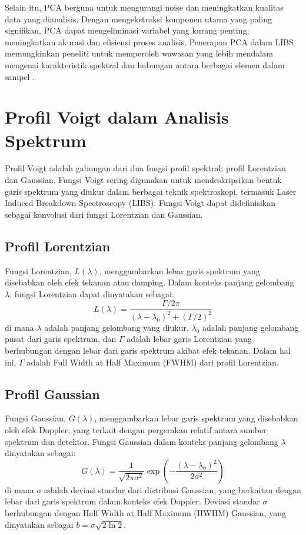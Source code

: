 \par Selain itu, PCA berguna untuk mengurangi noise dan meningkatkan kualitas data yang dianalisis. Dengan mengekstraksi komponen utama yang paling signifikan, PCA dapat mengeliminasi variabel yang kurang penting, meningkatkan akurasi dan efisiensi proses analisis. Penerapan PCA dalam LIBS memungkinkan peneliti untuk memperoleh wawasan yang lebih mendalam mengenai karakteristik spektral dan hubungan antara berbagai elemen dalam sampel \citep{lee2021}.

\section{Profil Voigt dalam Analisis Spektrum}
\par Profil Voigt adalah gabungan dari dua fungsi profil spektral: profil Lorentzian dan Gaussian. Fungsi Voigt sering digunakan untuk mendeskripsikan bentuk garis spektrum yang diukur dalam berbagai teknik spektroskopi, termasuk Laser Induced Breakdown Spectroscopy (LIBS). Fungsi Voigt dapat didefinisikan sebagai konvolusi dari fungsi Lorentzian dan Gaussian.

\subsection{Profil Lorentzian}
\par Fungsi Lorentzian, \( L(\lambda) \), menggambarkan lebar garis spektrum yang disebabkan oleh efek tekanan atau damping. Dalam konteks panjang gelombang \( \lambda \), fungsi Lorentzian dapat dinyatakan sebagai:
\begin{equation}
L(\lambda) = \frac{\Gamma / 2\pi}{(\lambda - \lambda_0)^2 + (\Gamma / 2)^2}
\end{equation}
di mana \( \lambda \) adalah panjang gelombang yang diukur, \( \lambda_0 \) adalah panjang gelombang pusat dari garis spektrum, dan \( \Gamma \) adalah lebar garis Lorentzian yang berhubungan dengan lebar dari garis spektrum akibat efek tekanan. Dalam hal ini, \( \Gamma \) adalah Full Width at Half Maximum (FWHM) dari profil Lorentzian.

\subsection{Profil Gaussian}
\par Fungsi Gaussian, \( G(\lambda) \), menggambarkan lebar garis spektrum yang disebabkan oleh efek Doppler, yang terkait dengan pergerakan relatif antara sumber spektrum dan detektor. Fungsi Gaussian dalam konteks panjang gelombang \( \lambda \) dinyatakan sebagai:
\begin{equation}
G(\lambda) = \frac{1}{\sqrt{2\pi \sigma^2}} \exp\left(-\frac{(\lambda - \lambda_0)^2}{2\sigma^2}\right)
\end{equation}
di mana \( \sigma \) adalah deviasi standar dari distribusi Gaussian, yang berkaitan dengan lebar dari garis spektrum dalam konteks efek Doppler. Deviasi standar \( \sigma \) berhubungan dengan Half Width at Half Maximum (HWHM) Gaussian, yang dinyatakan sebagai \( b = \sigma \sqrt{2 \ln 2} \).

